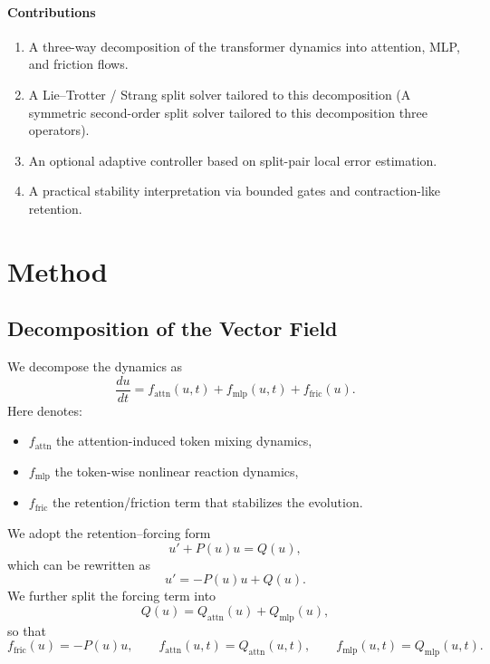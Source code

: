 \documentclass{article}
\newcommand{\Attn}{\mathrm{attn}}
\newcommand{\MLP}{\mathrm{mlp}}
\newcommand{\Fric}{\mathrm{fric}}
\begin{document}
\paragraph{Contributions}
\begin{enumerate}[leftmargin=1.5em]
    \item A three-way decomposition of the transformer dynamics into attention, MLP, and friction flows.
    \item A Lie--Trotter / Strang split solver tailored to this decomposition (A symmetric second-order split solver tailored to this decomposition three operators).
    \item An optional adaptive controller based on split-pair local error estimation.
    \item A practical stability interpretation via bounded gates and contraction-like retention.
\end{enumerate}

\section{Method}

\subsection{Decomposition of the Vector Field}
We decompose the dynamics as
\begin{equation}
    \frac{du}{dt} = f_{\Attn}(u,t) + f_{\MLP}(u,t) + f_{\Fric}(u).
\end{equation}
Here denotes:
\begin{itemize}[leftmargin=1.5em]
    \item $f_{\Attn}$ the attention-induced token mixing dynamics,
    \item $f_{\MLP}$ the token-wise nonlinear reaction dynamics,
    \item $f_{\Fric}$ the retention/friction term that stabilizes the evolution.
\end{itemize}

We adopt the retention--forcing form
\begin{equation}
    u' + P(u)u = Q(u),
\end{equation}
which can be rewritten as
\begin{equation}
    u' = -P(u)u + Q(u).
\end{equation}
We further split the forcing term into
\begin{equation}
    Q(u) = Q_{\Attn}(u) + Q_{\MLP}(u),
\end{equation}
so that
\begin{equation}
    f_{\Fric}(u) = -P(u)u,
    \qquad
    f_{\Attn}(u,t) = Q_{\Attn}(u,t),
    \qquad
    f_{\MLP}(u,t) = Q_{\MLP}(u,t).
\end{equation}
\end{document}
